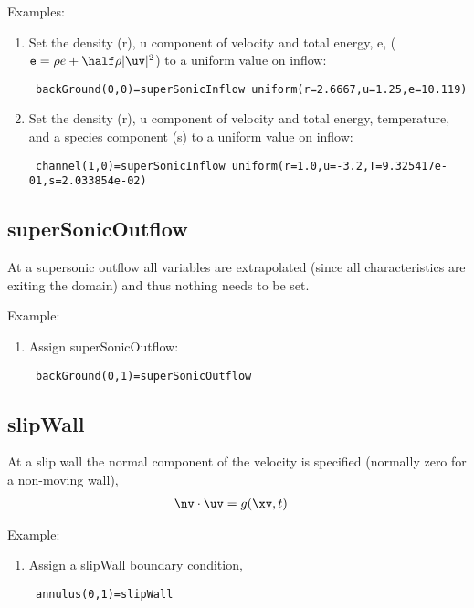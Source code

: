 Examples:
\begin{enumerate}
  \item Set the density (r), u component of velocity and total energy, e, (${\tt e} =\rho e + \half \rho |\uv|^2$) to a uniform
       value on inflow:
  \begin{flushleft}\tt
    backGround(0,0)=superSonicInflow uniform(r=2.6667,u=1.25,e=10.119)
  \end{flushleft}
  \item Set the density (r), u component of velocity and total energy, temperature, and a species component (s) to a uniform
       value on inflow:
  \begin{flushleft}\tt
    channel(1,0)=superSonicInflow uniform(r=1.0,u=-3.2,T=9.325417e-01,s=2.033854e-02)
  \end{flushleft}
\end{enumerate}

\subsection{superSonicOutflow} \label{sec:bc:superSonicOutflow}

At a supersonic outflow all variables are extrapolated (since all characteristics are exiting the domain)
and thus nothing needs to be set.

Example:
\begin{enumerate}
  \item Assign superSonicOutflow:
  \begin{flushleft}\tt
    backGround(0,1)=superSonicOutflow
  \end{flushleft}
\end{enumerate}

\subsection{slipWall} \label{sec:bc:slipWall}

At a slip wall the normal component of the velocity is specified (normally zero
for a non-moving wall),
\begin{align}
   \nv\cdot\uv & = g(\xv,t) 
\end{align}

Example:
\begin{enumerate}
  \item Assign a slipWall boundary condition,
  \begin{flushleft}\tt
    annulus(0,1)=slipWall
  \end{flushleft}
\end{enumerate}

